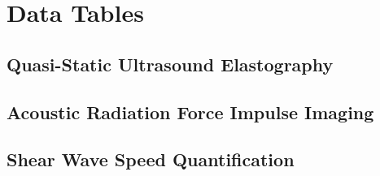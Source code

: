 \chapter{Data Tables}
	\section{Quasi-Static Ultrasound Elastography}
	\section{Acoustic Radiation Force Impulse Imaging}
	\section{Shear Wave Speed Quantification}